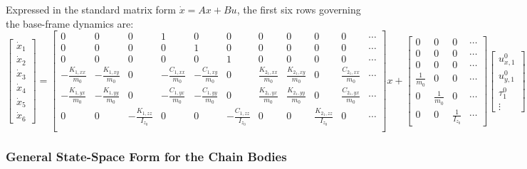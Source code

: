 \documentclass[11pt]{article}
\theoremstyle{definition}
\begin{document}
Expressed in the standard matrix form $\dot{x} = Ax + Bu$, the first six rows governing the base-frame dynamics are:
\setcounter{MaxMatrixCols}{20}
\begin{equation}
\begin{bmatrix}\dot{x}_1\\\dot{x}_2\\\dot{x}_3\\\dot{x}_4\\\dot{x}_5\\\dot{x}_6\end{bmatrix}
=
\begin{bmatrix}
    0 & 0 & 0 & 1 & 0 & 0 & 0 & 0 & 0 & 0 & \cdots \\
    0 & 0 & 0 & 0 & 1 & 0 & 0 & 0 & 0 & 0 & \cdots \\
    0 & 0 & 0 & 0 & 0 & 1 & 0 & 0 & 0 & 0 & \cdots \\
    -\frac{K_{1,xx}}{m_0} & -\frac{K_{1,xy}}{m_0} & 0 &
    -\frac{C_{1,xx}}{m_0} & -\frac{C_{1,xy}}{m_0} & 0 &
    \frac{K_{2_1,xx}}{m_0} & \frac{K_{2_1,xy}}{m_0} & 0 &
    \frac{C_{2_1,xx}}{m_0} & \cdots \\
    -\frac{K_{1,yx}}{m_0} & -\frac{K_{1,yy}}{m_0} & 0 &
    -\frac{C_{1,yx}}{m_0} & -\frac{C_{1,yy}}{m_0} & 0 &
    \frac{K_{2_1,yx}}{m_0} & \frac{K_{2_1,yy}}{m_0} & 0 &
    \frac{C_{2_1,yx}}{m_0} & \cdots \\
    0 & 0 & -\frac{K_{1,zz}}{I_{z_0}} & 0 & 0 &
    -\frac{C_{1,zz}}{I_{z_0}} & 0 & 0 &
    \frac{K_{2_1,zz}}{I_{z_0}} & 0 & \cdots \\
\end{bmatrix}
x
+
\begin{bmatrix}
    0 & 0 & 0 & \cdots \\
    0 & 0 & 0 & \cdots \\
    0 & 0 & 0 & \cdots \\
    \frac{1}{m_0} & 0 & 0 & \cdots \\
    0 & \frac{1}{m_0} & 0 & \cdots \\
    0 & 0 & \frac{1}{I_{z_0}} & \cdots
\end{bmatrix}
\begin{bmatrix}u^0_{x,1}\\u^0_{y,1}\\\tau^0_1\\\vdots\end{bmatrix}
\end{equation}

\subsubsection{General State-Space Form for the Chain Bodies}
\end{document}
